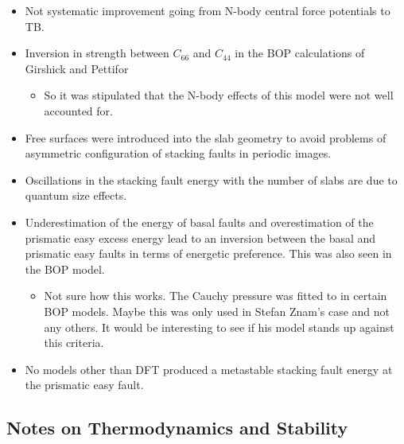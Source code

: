 \documentclass[11pt]{article}
\begin{document}
\begin{enumerate}
\begin{enumerate}
\begin{itemize}
\item Not systematic improvement going from N-body central force potentials
to TB.
\item Inversion in strength between \(C_{66}\) and \(C_{44}\) in the BOP
calculations of Girshick and Pettifor
\begin{itemize}
\item So it was stipulated that the N-body effects of this model were not
well accounted for.
\end{itemize}
\item Free surfaces were introduced into the slab geometry to avoid problems
of asymmetric configuration of stacking faults in periodic images.
\item Oscillations in the stacking fault energy with the number of slabs are
due to quantum size effects.
\item Underestimation of the energy of basal faults and overestimation of the
prismatic easy excess energy lead to an inversion between the basal and
prismatic easy faults in terms of energetic preference. This was also
seen in the BOP model.  
\begin{itemize}
\item Not sure how this works. The Cauchy pressure was fitted to in certain
BOP models. Maybe this was only used in Stefan Znam's case and not
any others. It would be interesting to see if his model stands up
against this criteria.
\end{itemize}
\item No models other than DFT produced a metastable stacking fault energy at
the prismatic easy fault.
\end{itemize}
\end{enumerate}
\end{enumerate}
\subsection{Notes on Thermodynamics and Stability}
\label{sec:orgd2afb44}
\end{document}
